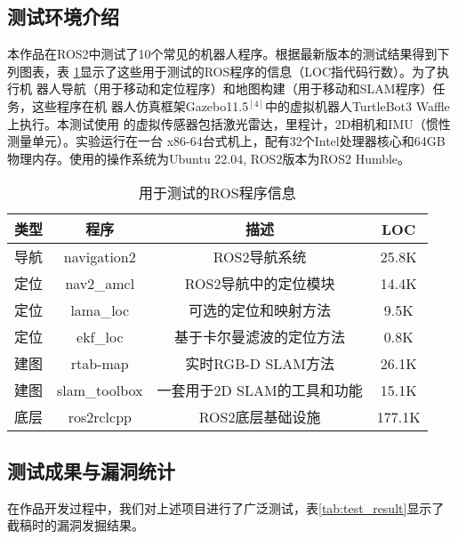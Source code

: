\subsection{测试环境介绍}
本作品在ROS2中测试了10个常见的机器人程序。根据最新版本的测试结果得到下列图表，表
\ref{tb:ros_test}显示了这些用于测试的ROS程序的信息（LOC指代码行数）。为了执行机
器人导航（用于移动和定位程序）和地图构建（用于移动和SLAM程序）任务，这些程序在机
器人仿真框架Gazebo11.5$^{[4]}$中的虚拟机器人TurtleBot3 Waffle上执行。本测试使用
的虚拟传感器包括激光雷达，里程计，2D相机和IMU（惯性测量单元）。实验运行在一台
x86-64台式机上，配有32个Intel处理器核心和64GB物理内存。使用的操作系统为Ubuntu
22.04, ROS2版本为ROS2 Humble。
\begin{table}[H]
	\small
	\caption{用于测试的ROS程序信息}
	\label{tb:ros_test}
	\centering
	\begin{tabular}{cccc}
		\hline  
		\textbf{类型} & \textbf{程序} & \textbf{描述} & \textbf{LOC} \\ 
		\hline  
    导航 & navigation2 & ROS2导航系统 & 25.8K \\
		定位 & nav2\_amcl & ROS2导航中的定位模块 & 14.4K \\
		定位 & lama\_loc & 可选的定位和映射方法 & 9.5K \\
		定位 & ekf\_loc & 基于卡尔曼滤波的定位方法 & 0.8K \\
		建图 & rtab-map & 实时RGB-D SLAM方法 & 26.1K \\
		建图 & slam\_toolbox & 一套用于2D SLAM的工具和功能 & 15.1K \\
    底层 & ros2rclcpp & ROS2底层基础设施 & 177.1K \\
		\hline
	\end{tabular} 
\end{table}

\subsection{测试成果与漏洞统计}
在作品开发过程中，我们对上述项目进行了广泛测试，表\ref{tab:test_result}显示了
截稿时的漏洞发掘结果。

